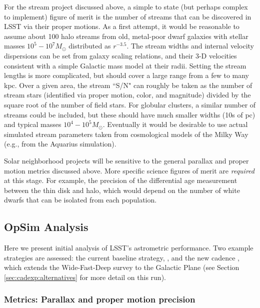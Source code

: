 For the stream project discussed above, a simple to state (but perhaps complex to implement) figure of merit
is the number of streams that can be discovered in LSST via their proper motions. As a first
attempt, it would be reasonable to assume about 100 halo streams from old, metal-poor dwarf galaxies with
stellar masses $10^5-10^7 M_{\odot}$ distributed as $r^{-3.5}$. The stream widths and internal velocity
dispersions can be set from galaxy scaling relations, and their 3-D velocities consistent with a simple Galactic mass
model at their radii. Setting the stream lengths is more complicated, but should cover a large range from a few to many kpc.
Over a given area, the stream ``S/N" can roughly be taken as the number of stream stars (identified via proper motion, color, and magnitude)
divided by the square root of the number of field stars. For globular clusters, a similar number of streams could be included, but these should have much smaller widths (10s of pc)
and typical masses $10^4-10^5 M_{\odot}$. Eventually it would be desirable to use actual simulated stream parameters taken from cosmological models of the Milky Way (e.g.,
from the Aquarius simulation).

Solar neighborhood projects will be sensitive to the general parallax and proper motion metrics discussed above. More specific science figures of merit are {\it required} at this stage.  For example, the precision of the differential age measurement between the thin disk and halo, which would depend on the number of white dwarfs that can be isolated
from each population.

\subsection{OpSim Analysis}
\label{sec:\secname:MW_Astrometry_OpSim}

Here we present initial analysis of LSST's astrometric
performance. Two example strategies are assessed: the current baseline
strategy, , and the new cadence
, which extends the Wide-Fast-Deep
survey to the Galactic Plane (see Section \autoref{sec:cadexp:alternatives}
for more detail on this run).


\subsubsection{Metrics: Parallax and proper motion precision}

